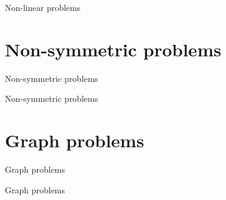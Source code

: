 \documentclass[18pt,xcolor=table]{beamer}
\begin{document}
\begin{frame}{Non-linear problems}
\begin{block}{}
\bit
\item 
\eit
\end{block}
\end{frame}



\section{Non-symmetric problems}

\begin{frame}{Non-symmetric problems}
\begin{block}{}
\bit
\item 
\eit
\end{block}
\end{frame}

\begin{frame}{Non-symmetric problems}
\begin{block}{}
\bit
\item 
\eit
\end{block}
\end{frame}



\section{Graph problems}

\begin{frame}{Graph problems}
\begin{block}{}
\bit
\item 
\eit
\end{block}
\end{frame}

\begin{frame}{Graph problems}
\begin{block}{}
\bit
\item 
\eit
\end{block}
\end{frame}


\end{document}
